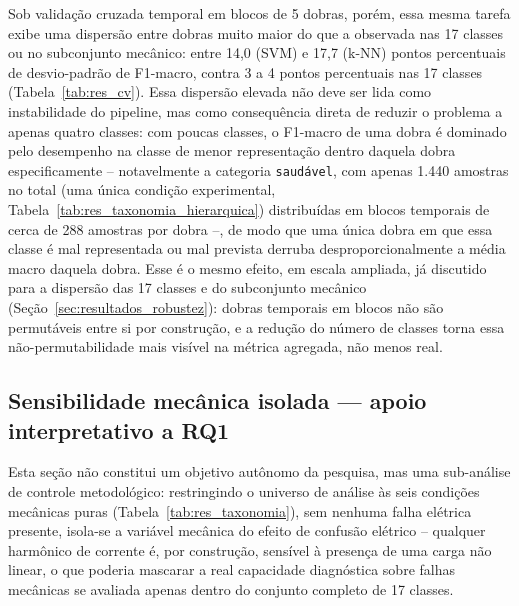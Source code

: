 \documentclass[times,final]{elsarticle}
\begin{document}
{Sob validação cruzada temporal em blocos de 5 dobras, porém, essa mesma tarefa exibe uma dispersão entre dobras muito maior do que a observada nas 17 classes ou no subconjunto mecânico: entre 14,0 (SVM) e 17,7 (k-NN) pontos percentuais de desvio-padrão de F1-macro, contra 3 a 4 pontos percentuais nas 17 classes (Tabela~\ref{tab:res_cv}). Essa dispersão elevada não deve ser lida como instabilidade do pipeline, mas como consequência direta de reduzir o problema a apenas quatro classes: com poucas classes, o F1-macro de uma dobra é dominado pelo desempenho na classe de menor representação dentro daquela dobra especificamente -- notavelmente a categoria \texttt{saudável}, com apenas 1.440 amostras no total (uma única condição experimental, Tabela~\ref{tab:res_taxonomia_hierarquica}) distribuídas em blocos temporais de cerca de 288 amostras por dobra --, de modo que uma única dobra em que essa classe é mal representada ou mal prevista derruba desproporcionalmente a média macro daquela dobra. Esse é o mesmo efeito, em escala ampliada, já discutido para a dispersão das 17 classes e do subconjunto mecânico (Seção~\ref{sec:resultados_robustez}): dobras temporais em blocos não são permutáveis entre si por construção, e a redução do número de classes torna essa não-permutabilidade mais visível na métrica agregada, não menos real.
}

\subsection{Sensibilidade mecânica isolada --- apoio interpretativo a RQ1}
\label{sec:resultados_sensibilidade}

Esta seção não constitui um objetivo autônomo da pesquisa, mas uma sub-análise de controle metodológico: restringindo o universo de análise às seis condições mecânicas puras (Tabela~\ref{tab:res_taxonomia}), sem nenhuma falha elétrica presente, isola-se a variável mecânica do efeito de confusão elétrico -- qualquer harmônico de corrente é, por construção, sensível à presença de uma carga não linear, o que poderia mascarar a real capacidade diagnóstica sobre falhas mecânicas se avaliada apenas dentro do conjunto completo de 17 classes.
\end{document}
